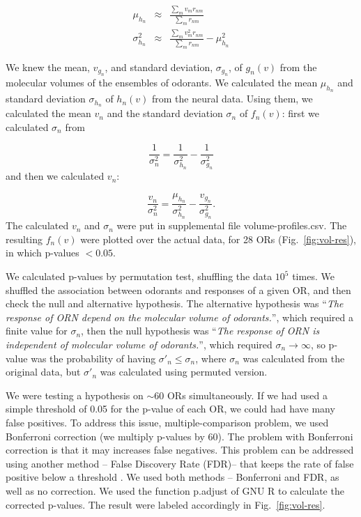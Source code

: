 \documentclass[11pt]{paper} %
\newcommand{\numberofreceptors}{ 28 }
\begin{document}
\begin{eqnarray}
	\mu_{h_n} &\approx& \frac{\displaystyle \sum_{m} v_m r_{nm}}{\displaystyle \sum_{m} r_{nm}} \\
	\sigma_{h_n}^2 &\approx& \frac{\displaystyle \sum_{m} v_m^2 r_{nm}}{\displaystyle \sum_{m} r_{nm}} - \mu_{h_n}^2
	\label{eqn:final_h}
\end{eqnarray}


We knew the mean, $v_{g_n}$, and standard deviation, $\sigma_{g_n}$, of $g_n(v)$ from the molecular volumes of the ensembles of odorants. 
We calculated the mean $\mu_{h_n}$ and standard deviation $\sigma_{h_n}$ of $h_n(v)$ from the neural data.
Using them, we calculated the mean $v_n$ and the standard deviation $\sigma_n$ of $f_n(v)$:
first we calculated $\sigma_n$ from 

\begin{equation}
	\frac{1}{\sigma_n^2} = \frac{1}{\sigma^2_{h_n}}  - \frac{1}{\sigma^2_{g_n}}
\end{equation}
and then we calculated $v_n$: 

\begin{equation}
	\frac{v_n}{\sigma_n^2}  =    \frac{\mu_{h_n}}{\sigma^2_{h_n}} - \frac{v_{g_n}}{\sigma^2_{g_n}}.
\end{equation}
The calculated $v_n$ and $\sigma_n$ were put in supplemental file volume-profiles.csv. 
The resulting $f_n(v)$ were plotted over the actual data, for \numberofreceptors ORs (Fig.~\ref{fig:vol-res}),
in which p-values $<0.05$. 

We calculated p-values by permutation test, shuffling the data $10^5$ times. 
We shuffled the association between odorants and responses of a given OR,  
and then check the null and alternative hypothesis. 
The alternative hypothesis was
``{\it The response of ORN depend on the molecular volume of odorants.}'', 
which required  a finite value for $\sigma_n$, 
then the null hypothesis was 
``{\it The response of ORN is independent of molecular volume of odorants.}'',
which required $\sigma_n \rightarrow \infty$, 
so p-value was the probability of having $\sigma'_n\leq\sigma_n$, 
where $\sigma_n$ was calculated from the original data, but $\sigma'_n$ was calculated using permuted version. 

We were testing a hypothesis on $\sim$60 ORs simultaneously. 
If we had used a simple threshold of 0.05 for the p-value of each OR, we could had have many false positives. 
To address this issue, multiple-comparison problem, 
we used Bonferroni correction (we multiply p-values by 60). 
The problem with Bonferroni correction is that it may increases false negatives.
This problem can be addressed using another method -- False Discovery Rate (FDR)--  that keeps the rate of false positive below a threshold \cite{benjamini1995controlling,shaffer1995multiple}.
We used both methods -- Bonferroni and FDR, as well as no correction. We used the function p.adjust of GNU R to calculate the corrected p-values. 
The result were labeled accordingly in Fig.~\ref{fig:vol-res}.
\end{document}
